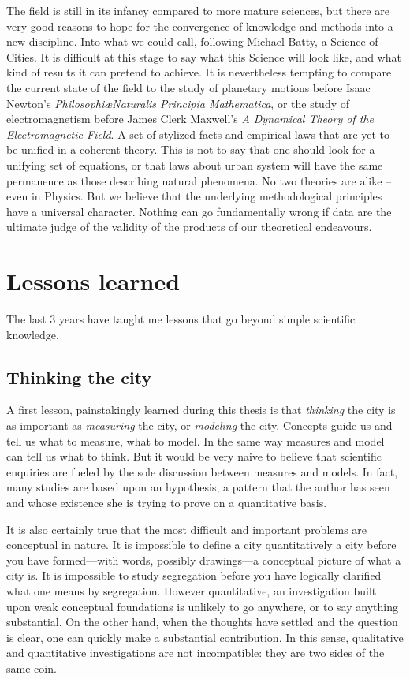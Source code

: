 The field is still in its infancy compared to more mature sciences, but there
are very good reasons to hope for the convergence of knowledge and methods into
a new discipline. Into what we could call, following Michael Batty, a Science of
Cities. It is difficult at this stage to say what this Science will look like,
and what kind of results it can pretend to achieve. It is nevertheless tempting to
compare the current state of the field to the study of planetary motions
before Isaac Newton's \emph{Philosophi\ae Naturalis Principia Mathematica}, or
the study of electromagnetism before James Clerk Maxwell's \emph{A Dynamical
Theory of the Electromagnetic Field}. A set of stylized facts and empirical laws
that are yet to be unified in a coherent theory. This is not to say that one
should look for a unifying set of equations, or that laws about urban system
will have the same permanence as those describing natural phenomena. No two
theories are alike -- even in Physics. But we believe that the underlying
methodological principles have a universal character. Nothing can go
fundamentally wrong if data are the ultimate judge of the validity of the
products of our theoretical endeavours.



\section{Lessons learned}
\label{sec:what_the_past_3_years_have_brought}

The last $3$ years have taught me lessons that go beyond simple scientific
knowledge.

\subsection{Thinking the city}
\label{sub:thinking_the_city}

A first lesson, painstakingly learned during this thesis is that \emph{thinking} the
city is as important as \emph{measuring} the city, or \emph{modeling} the city.
Concepts guide us and tell us what to measure, what to model. In the same way
measures and model can tell us what to think. But it would be very naive to
believe that scientific enquiries are fueled by the sole discussion between
measures and models. In fact, many studies are based upon an hypothesis, a
pattern that the author has seen and whose existence she is trying to prove on a
quantitative basis. 

It is also certainly true that the most difficult and important problems are
conceptual in nature.  It is impossible to define a city quantitatively a city
before you have formed---with words, possibly drawings---a conceptual picture of
what a city is.  It is impossible to study segregation before you have logically
clarified what one means by segregation. However quantitative, an investigation
built upon weak conceptual foundations is unlikely to go anywhere, or to say
anything substantial. On the other hand, when the thoughts have settled and the
question is clear, one can quickly make a substantial contribution. In this
sense, qualitative and quantitative investigations are not incompatible: they
are two sides of the same coin.\\


